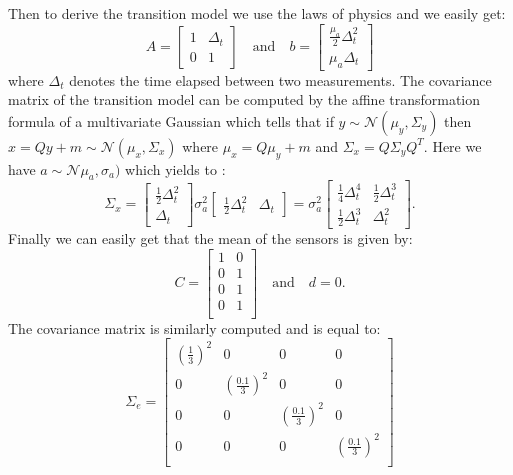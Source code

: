 \documentclass[9pt,a4paper]{extarticle}
\newenvironment{solution}
    {%
    \color{red}
    }
    { 
    \color{black}
    }
\begin{document}
\begin{solution}
   Then to derive the transition model we use the laws of physics and we easily get:
   $$ A = 
   \begin{bmatrix} 
   1 & \Delta_t\\
   0 & 1
   \end{bmatrix} \quad \text{and} \quad b = 
   \begin{bmatrix}
   \frac{\mu_a}{2}\Delta_t^2\\
   \mu_a \Delta_t
   \end{bmatrix}
   $$ where $\Delta_t$ denotes the time elapsed between two measurements.
   The covariance matrix of the transition model can be computed by the affine transformation formula of a multivariate Gaussian which tells that if $y\sim \mathcal{N}(\mu_y, \Sigma_y)$ then $x = Qy+m \sim \mathcal{N}(\mu_x, \Sigma_x)$ where $\mu_x = Q\mu_y+m $ and $\Sigma_x = Q\Sigma_y Q^T$. Here we have $a\sim\mathcal{N}\mu_a, \sigma_a)$ which yields to :
   $$\Sigma_x =  \begin{bmatrix}
   \frac{1}{2}\Delta_t^2\\
    \Delta_t
   \end{bmatrix} \sigma_a^2 \begin{bmatrix}
   \frac{1}{2}\Delta_t^2&
    \Delta_t
   \end{bmatrix} = \sigma_a^2 \begin{bmatrix}
   \frac{1}{4}\Delta_t^4 & \frac{1}{2}\Delta_t^3\\
    \frac{1}{2}\Delta_t^3 & \Delta_t^2
   \end{bmatrix}.$$
   Finally we can easily get that the mean of the sensors is given by:
   $$
   C = 
   \begin{bmatrix}
   1 & 0\\
   0 & 1\\
   0 & 1\\
   0 & 1\\
   \end{bmatrix} \quad \text{and} \quad 
   d = 0.
   $$
   The covariance matrix is similarly computed and is equal to:
   $$
   \Sigma_e = 
   \begin{bmatrix}
   (\frac{1}{3})^2 & 0 & 0 & 0\\
   0 & (\frac{0.1}{3})^2 & 0 & 0\\
   0 & 0 & (\frac{0.1}{3})^2 & 0\\
   0 & 0 & 0 & (\frac{0.1}{3})^2\\
   \end{bmatrix}
   $$
   \end{solution}
\end{document}
